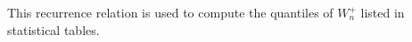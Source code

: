 \begin{remark}
This recurrence relation is used to compute the quantiles of $W^{+}_n$ listed in statistical tables.
\end{remark}

%
%
%
%
%
%
%
%
%
%
%


